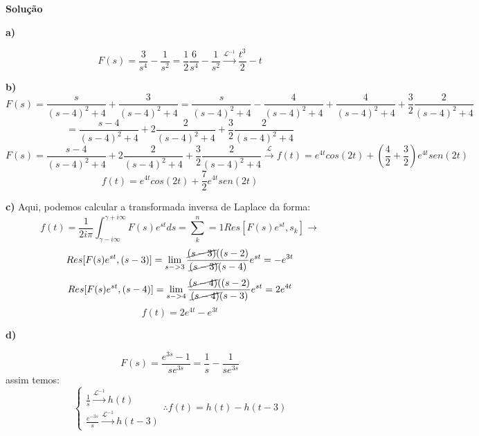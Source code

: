\linespread{1.5}

\textbf{Solução}

\textbf{a)}

\begin{equation*}
    F(s) = \frac{3}{s^4} - \frac{1}{s^2} = \frac{1}{2}\frac{6}{s^4} - \frac{1}{s^2} \xrightarrow{\mathcal{L}^{-1}} \frac{t^3}{2} - t
\end{equation*}

\textbf{b)}
\begin{equation*}
    F(s) = \frac{s}{(s-4)^2+4} + \frac{3}{(s-4)^2+4} = \frac{s}{(s-4)^2+4} - \frac{4}{(s-4)^2+4} + \frac{4}{(s-4)^2+4} + \frac{3}{2}\frac{2}{(s-4)^2+4}
\end{equation*}
\begin{equation*}
    = \frac{s-4}{(s-4)^2+4} + 2\frac{2}{(s-4)^2+4} + \frac{3}{2}\frac{2}{(s-4)^2+4}
\end{equation*}
\begin{equation*}
    F(s) = \frac{s-4}{(s-4)^2+4} + 2\frac{2}{(s-4)^2+4} + \frac{3}{2}\frac{2}{(s-4)^2+4} \xrightarrow{\mathcal{L}} f(t) = e^{4t}cos(2t) + \left(\frac{4}{2}+ \frac{3}{2}\right)e^{4t}sen(2t) 
\end{equation*}
\begin{equation*}
    \boxed{f(t) = e^{4t}cos(2t) + \frac{7}{2}e^{4t}sen(2t) }
\end{equation*}

\textbf{c)}
Aqui, podemos calcular a transformada inversa de Laplace da forma:
\begin{equation*}
    f(t) = \frac{1}{2i\pi}\int^{\gamma +i\infty}_{\gamma - i\infty} F(s)e^{st}ds = \sum^n_k=1 Res[F(s)e^{st}, s_k] \longrightarrow 
\end{equation*}
\begin{equation*}
    Res[F(s)e^{st}, (s-3)] = \lim_{s->3} \frac{\cancel{(s-3)}((s-2)}{\cancel{(s-3)}{(s-4)}}e^{st} = -e^{3t}
\end{equation*}
\begin{equation*}
    Res[F(s)e^{st}, (s-4)] = \lim_{s->4} \frac{\cancel{(s-4)}((s-2)}{\cancel{(s-4)}{(s-3)}}e^{st} = 2e^{4t}
\end{equation*}
\begin{equation*}
    \boxed{f(t) = 2e^{4t} - e^{3t}}
\end{equation*}

\textbf{d)}

\begin{equation*}
    F(s) = \frac{e^{3s} -1}{se^{3s}} = \frac{1}{s} - \frac{1}{se^{3s}}
\end{equation*}
assim temos:
\begin{equation*}
    \begin{cases}
    \frac{1}{s} \xrightarrow{\mathcal{L}^{-1}} h(t)\\
    \frac{e^{-3s}}{s}\xrightarrow{\mathcal{L}^{-1}} h(t-3)
    \end{cases} \therefore \boxed{f(t) = h(t) - h(t-3)}
\end{equation*}


